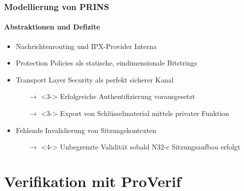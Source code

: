 \documentclass{beamer}
\begin{document}
\begin{frame}
    \frametitle{Modellierung von PRINS}
    \framesubtitle{Abstraktionen und Defizite}

    \begin{itemize}
        \item<1-> Nachrichtenrouting und IPX-Provider Interna
        \vspace*{2mm}
        \item<2-> Protection Policies als statische, eindimensionale Bitstrings
        \vspace*{2mm}
        \item<3-> Transport Layer Security als perfekt sicherer Kanal
        \begin{itemize}
            \item[$\rightarrow$]<3-> Erfolgreiche Authentifizierung vorausgesetzt
            \item[$\rightarrow$]<3-> Export von Schlüsselmaterial mittels privater Funktion
        \end{itemize}
        \vspace*{2mm}
        \item<4-> Fehlende Invalidierung von Sitzungskontexten
        \begin{itemize}
            \item[$\rightarrow$]<4-> Unbegrenzte Validität sobald N32-c Sitzungsaufbau erfolgt
        \end{itemize}
    \end{itemize}
\end{frame}

\section{Verifikation mit ProVerif}
\end{document}
